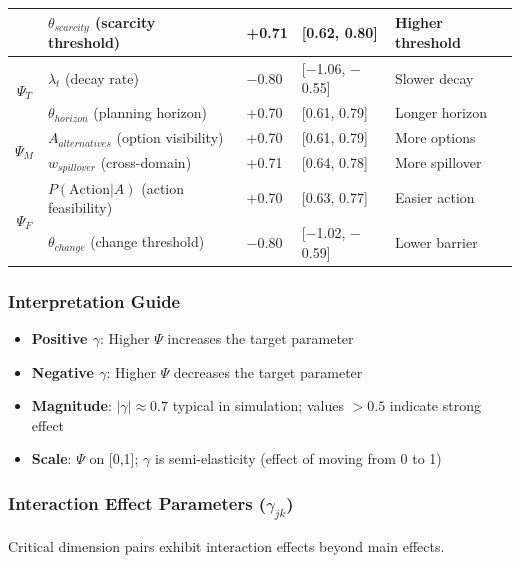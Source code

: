 \begin{table}[htbp]
\begin{tabular}{@{}cllll@{}}
& $\theta_{scarcity}$ (scarcity threshold) & +0.71 & [0.62, 0.80] & Higher threshold \\
\midrule
\multirow{2}{*}{$\Psi_T$} 
& $\lambda_t$ (decay rate) & $-$0.80 & [$-$1.06, $-$0.55] & Slower decay \\
& $\theta_{horizon}$ (planning horizon) & +0.70 & [0.61, 0.79] & Longer horizon \\
\midrule
\multirow{2}{*}{$\Psi_M$} 
& $A_{alternatives}$ (option visibility) & +0.70 & [0.61, 0.79] & More options \\
& $w_{spillover}$ (cross-domain) & +0.71 & [0.64, 0.78] & More spillover \\
\midrule
\multirow{2}{*}{$\Psi_F$} 
& $P(\text{Action}|A)$ (action feasibility) & +0.70 & [0.63, 0.77] & Easier action \\
& $\theta_{change}$ (change threshold) & $-$0.80 & [$-$1.02, $-$0.59] & Lower barrier \\
\bottomrule
\end{tabular}
\end{table}

\subsubsection{Interpretation Guide}

\begin{itemize}
    \item \textbf{Positive $\gamma$}: Higher $\Psi$ increases the target parameter
    \item \textbf{Negative $\gamma$}: Higher $\Psi$ decreases the target parameter
    \item \textbf{Magnitude}: $|\gamma| \approx 0.7$ typical in simulation; values $>0.5$ indicate strong effect
    \item \textbf{Scale}: $\Psi$ on [0,1]; $\gamma$ is semi-elasticity (effect of moving from 0 to 1)
\end{itemize}

\subsubsection{Interaction Effect Parameters ($\gamma_{jk}$)}

Critical dimension pairs exhibit interaction effects beyond main effects.

